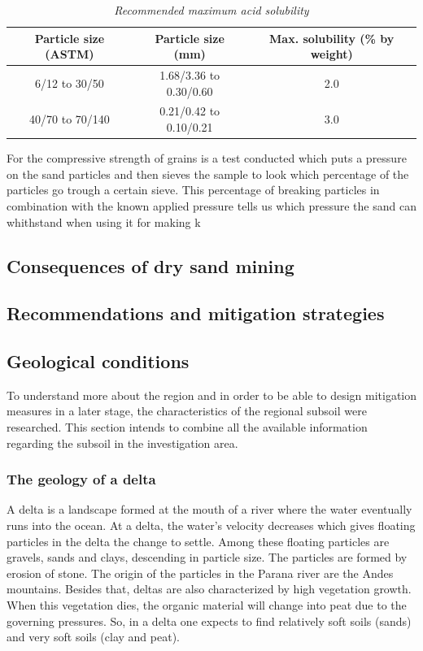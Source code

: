 \begin{table}[h!]
\centering
\begin{tabular}{|c|c|c|}
\hline
\textbf{Particle size (ASTM)} & \textbf{Particle size (mm)} & \textbf{Max. solubility (\% by weight)} \\ \hline
6/12 to 30/50 & 1.68/3.36 to 0.30/0.60 & 2.0 \\ \hline
40/70 to 70/140 & 0.21/0.42 to 0.10/0.21 & 3.0 \\ \hline
\end{tabular}
\caption{\textit{Recommended maximum acid solubility}}
\label{tab:acid}
\end{table}

For the compressive strength of grains is a test conducted which puts a pressure on the sand particles and then sieves the sample to look which percentage of the particles go trough a certain sieve. This percentage of breaking particles in combination with the known applied pressure tells us which pressure the sand can whithstand when using it for making k

\subsection{Consequences of dry sand mining}

\subsection{Recommendations and mitigation strategies}

\subsection{Geological conditions}
To understand more about the region and in order to be able to design mitigation measures in a later stage, the characteristics of the regional subsoil were researched. This section intends to combine all the available information regarding the subsoil in the investigation area.

\subsubsection{The geology of a delta}
A delta is a landscape formed at the mouth of a river where the water eventually runs into the ocean. At a delta, the water's velocity decreases which gives floating particles in the delta the change to settle. Among these floating particles are gravels, sands and clays, descending in particle size. The particles are formed by erosion of stone. The origin of the particles in the Parana river are the Andes mountains. 
Besides that, deltas are also characterized by high vegetation growth. When this vegetation dies, the organic material will change into peat due to the governing pressures. So, in a delta one expects to find relatively soft soils (sands) and very soft soils (clay and peat).

